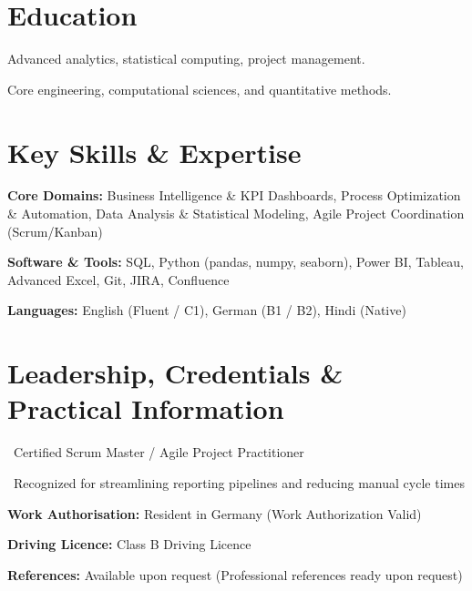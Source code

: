 \documentclass[10pt,a4paper]{article}
\begin{document}
\section*{Education}


{\small Advanced analytics, statistical computing, project management.}\par



{\small Core engineering, computational sciences, and quantitative methods.}\par



\section*{Key Skills \& Expertise}
\textbf{Core Domains:} Business Intelligence \& KPI Dashboards, Process Optimization \& Automation, Data Analysis \& Statistical Modeling, Agile Project Coordination (Scrum/Kanban)\par

\textbf{Software \& Tools:} SQL, Python (pandas, numpy, seaborn), Power BI, Tableau, Advanced Excel, Git, JIRA, Confluence\par
\textbf{Languages:} English (Fluent / C1), German (B1 / B2), Hindi (Native)


\section*{Leadership, Credentials \& Practical Information}

\textbullet\ Certified Scrum Master / Agile Project Practitioner\par

\textbullet\ Recognized for streamlining reporting pipelines and reducing manual cycle times\par

\textbf{Work Authorisation:} Resident in Germany (Work Authorization Valid)\par

\textbf{Driving Licence:} Class B Driving Licence\par


\textbf{References:} Available upon request (Professional references ready upon request)
\end{document}
